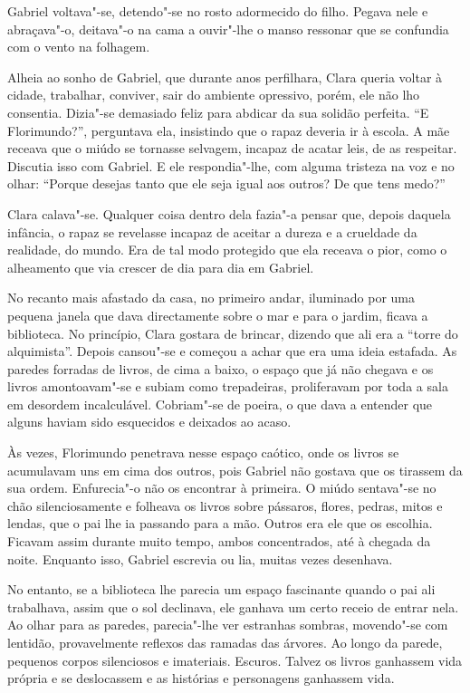 Gabriel voltava"-se, detendo"-se no rosto adormecido do filho. Pegava nele
e abraçava"-o, deitava"-o na cama a ouvir"-lhe o manso ressonar que se
confundia com o vento na folhagem.

Alheia ao sonho de Gabriel, que durante anos perfilhara, Clara queria
voltar à cidade, trabalhar, conviver, sair do ambiente opressivo, porém,
ele não lho consentia. Dizia"-se demasiado feliz para abdicar da sua
solidão perfeita. ``E Florimundo?'', perguntava ela, insistindo que o
rapaz deveria ir à escola. A mãe receava que o miúdo se tornasse
selvagem, incapaz de acatar leis, de as respeitar. Discutia isso com
Gabriel. E ele respondia"-lhe, com alguma tristeza na voz e no olhar:
``Porque desejas tanto que ele seja igual aos outros? De que tens medo?''

Clara calava"-se. Qualquer coisa dentro dela fazia"-a pensar que, depois
daquela infância, o rapaz se revelasse incapaz de aceitar a dureza e a
crueldade da realidade, do mundo. Era de tal modo protegido que ela
receava o pior, como o alheamento que via crescer de dia para dia em
Gabriel.

No recanto mais afastado da casa, no primeiro andar, iluminado por uma
pequena janela que dava directamente sobre o mar e para o jardim, ficava
a biblioteca. No princípio, Clara gostara de brincar, dizendo que ali
era a ``torre do alquimista''. Depois cansou"-se e começou a achar que
era uma ideia estafada. As paredes forradas de livros, de cima a baixo,
o espaço que já não chegava e os livros amontoavam"-se e subiam como
trepadeiras, proliferavam por toda a sala em desordem incalculável.
Cobriam"-se de poeira, o que dava a entender que alguns haviam sido
esquecidos e deixados ao acaso.

Às vezes, Florimundo penetrava nesse espaço caótico, onde os livros se
acumulavam uns em cima dos outros, pois Gabriel não gostava que os
tirassem da sua ordem. Enfurecia"-o não os encontrar à primeira. O miúdo
sentava"-se no chão silenciosamente e folheava os livros sobre pássaros,
flores, pedras, mitos e lendas, que o pai lhe ia passando para a mão.
Outros era ele que os escolhia. Ficavam assim durante muito tempo, ambos
concentrados, até à chegada da noite. Enquanto isso, Gabriel escrevia ou
lia, muitas vezes desenhava.

No entanto, se a biblioteca lhe parecia um espaço fascinante quando o
pai ali trabalhava, assim que o sol declinava, ele ganhava um certo
receio de entrar nela. Ao olhar para as paredes, parecia"-lhe ver
estranhas sombras, movendo"-se com lentidão, provavelmente reflexos das
ramadas das árvores. Ao longo da parede, pequenos corpos silenciosos e
imateriais. Escuros. Talvez os livros ganhassem vida própria e se
deslocassem e as histórias e personagens ganhassem vida.


